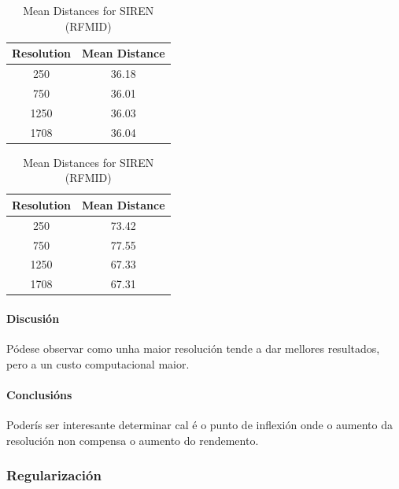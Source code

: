 \begin{table}[h]
    \centering
    \begin{minipage}[t]{0.45\linewidth}
        \centering
        \begin{tabular}{|c|c|}
        \hline
        Resolution & Mean Distance \\ \hline
        250 & 36.18 \\ \hline
        750 & 36.01 \\ \hline
        1250 & 36.03 \\ \hline
        1708 & 36.04 \\ \hline
        \end{tabular}
        \caption{Mean Distances for MLP (RFMID)}
        \label{tab:mlp_mean_distances_rfmid}
    \end{minipage}
    \hfill
    \begin{minipage}[t]{0.45\linewidth}
        \centering
        \begin{tabular}{|c|c|}
        \hline
        Resolution & Mean Distance \\ \hline
        250 & 73.42 \\ \hline
        750 & 77.55 \\ \hline
        1250 & 67.33 \\ \hline
        1708 & 67.31 \\ \hline
        \end{tabular}
        \caption{Mean Distances for SIREN (RFMID)}
        \label{tab:siren_mean_distances_rfmid}
    \end{minipage}
\end{table}

\paragraph{Discusión}
\label{par:Discusión}

Pódese observar como unha maior resolución tende a dar mellores resultados, pero a un custo computacional maior.

\paragraph{Conclusións}
\label{par:Conclusións}

Poderís ser interesante determinar cal é o punto de inflexión onde o aumento da resolución non compensa o aumento do rendemento.

\subsubsection{Regularización}
\label{subsubsec:Regularización}

